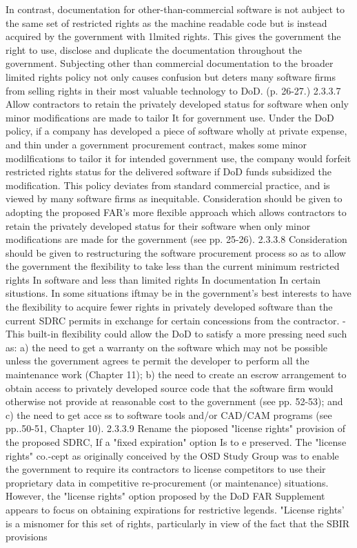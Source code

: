 \documentclass[12pt]{article}
\begin{document}
In contrast, documentation for other-than-commercial software is not aubject to the same set of
restricted rights as the machine readable code but is instead acquired by the government with 1lmited
rights. This gives the government the right to use, disclose and duplicate the documentation throughout the government. Subjecting other than commercial documentation to the broader limited rights
policy not only causes confusion but deters many software firms from selling rights in their most
valuable technology to DoD. (p. 26-27.)
2.3.3.7 Allow contractors to retain the privately developed status for software when only
minor modifications are made to tailor It for government use.
Under the DoD policy, if a company has developed a piece of software wholly at private expense, and
thin under a government procurement contract, makes some minor modilfications to tailor it for intended government use, the company would forfeit restricted rights status for the delivered software if
DoD funds subsidized the modification. This policy deviates from standard commercial practice, and
is viewed by many software firms as inequitable.
Consideration should be given to adopting the proposed FAR's more flexible approach which allows
contractors to retain the privately developed status for their software when only minor modifications
are made for the government (see pp. 25-26).
2.3.3.8 Consideration should be given to restructuring the software procurement process so
as to allow the government the flexibility to take less than the current minimum restricted
rights In software and less than limited rights In documentation In certain situstions.
In some situations iftmay be in the government's best interests to have the flexibility to acquire fewer
rights in privately developed software than the current SDRC permits in exchange for certain concessions from the contractor. -This built-in flexibility could allow the DoD to satisfy a more pressing need
such as:
a) the need to get a warranty on the software which may not be possible unless the government
agrees te permit the developer to perform all the maintenance work (Chapter 11);
b) the need to create an escrow arrangement to obtain access to privately developed source code
that the software firm would otherwise not provide at reasonable cost to the government (see pp.
52-53); and
c) the need to get acce ss to software tools and/or CAD/CAM programs (see pp..50-51, Chapter 10).
2.3.3.9 Rename the pioposed "license rights" provision of the proposed SDRC, If a "fixed
expiration" option Is to e preserved.
The "license rights" co.-cept as originally conceived by the OSD Study Group was to enable the
government to require its contractors to license competitors to use their proprietary data in competitive re-procurement (or maintenance) situations. However, the "license rights" option proposed by
the DoD FAR Supplement appears to focus on obtaining expirations for restrictive legends. "License
rights' is a misnomer for this set of rights, particularly in view of the fact that the SBIR provisions
\end{document}

